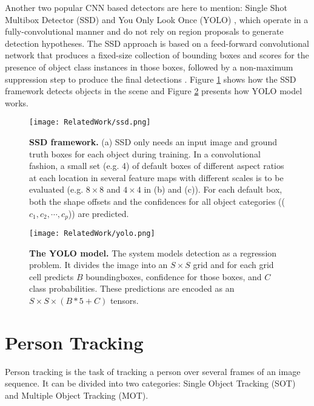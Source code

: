 Another two popular CNN based detectors are here to mention: Single Shot Multibox Detector (SSD) \cite{DBLP:journals/corr/LiuAESR15} and You Only Look Once (YOLO) \cite{DBLP:journals/corr/RedmonDGF15}, which operate in a fully-convolutional manner and do not rely on region proposals to generate detection hypotheses. The SSD approach is based on a feed-forward convolutional network that produces a fixed-size collection of bounding boxes and scores for the presence of object class
instances in those boxes, followed by a non-maximum suppression step to produce the final detections \cite{DBLP:journals/corr/LiuAESR15}. Figure \ref{fig:ssd} shows how the SSD framework detects objects in the scene and Figure \ref{fig:yolo} presents how YOLO model works. 

\begin{figure}[h!]
  \centering
  \texttt{[image: RelatedWork/ssd.png]}
  \caption{\textbf{SSD framework.} (a) SSD only needs an input image and ground truth boxes for each
           object during training. In a convolutional fashion, a small set (e.g. 4) of default boxes of
           different aspect ratios at each location in several feature maps with different scales is to 
           be evaluated (e.g. $8 \times 8$ and $4 \times 4$ in (b) and (c)). For each default box, both
           the shape offsets and the confidences for all object categories (($c_{1}, c_{2}, \cdots,
           c_{p}$)) are predicted. \cite{DBLP:journals/corr/LiuAESR15}}
  \label{fig:ssd}
\end{figure}

\begin{figure}[h!]
  \centering
  \texttt{[image: RelatedWork/yolo.png]}
  \caption{\textbf{The YOLO model.} The system models detection as a regression problem. It divides the
           image into an $S \times S$ grid and for each grid cell predicts $B$ boundingboxes, 
           confidence for those boxes, and $C$ class probabilities. These predictions are encoded as an
           $S \times S \times (B * 5 + C)$ tensors. \cite{DBLP:journals/corr/RedmonDGF15}}
  \label{fig:yolo}
\end{figure}

\section{Person Tracking}
Person tracking is the task of tracking a person over several frames of an image sequence. It can be divided into two categories: Single Object Tracking (SOT) and Multiple Object Tracking (MOT). 

